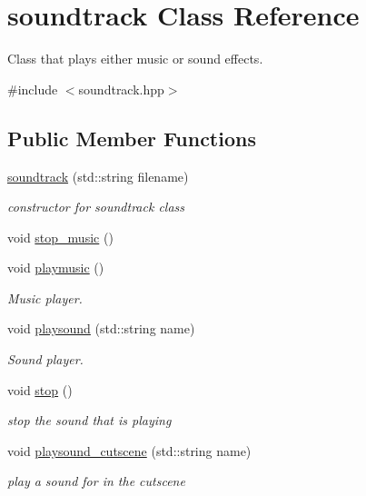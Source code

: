 \hypertarget{classsoundtrack}{}\section{soundtrack Class Reference}
\label{classsoundtrack}


Class that plays either music or sound effects.  




{\ttfamily \#include $<$soundtrack.\+hpp$>$}

\subsection*{Public Member Functions}
\begin{DoxyCompactItemize}
\item 
\hyperlink{classsoundtrack_add31bdeb1a693d541443f1d88586d3b6}{soundtrack} (std\+::string filename)
\begin{DoxyCompactList}\small\item\em constructor for soundtrack class \end{DoxyCompactList}\item 
void \hyperlink{classsoundtrack_a9f25fee4c6d5dbc820e2a18b13b43e68}{stop\+\_\+music} ()
\item 
void \hyperlink{classsoundtrack_a7569a4c0cde86548197756b8e05cf464}{playmusic} ()
\begin{DoxyCompactList}\small\item\em Music player. \end{DoxyCompactList}\item 
void \hyperlink{classsoundtrack_aa18de6469aca15922cfa8a8e8412f76d}{playsound} (std\+::string name)
\begin{DoxyCompactList}\small\item\em Sound player. \end{DoxyCompactList}\item 
\mbox{\label{classsoundtrack_a9047bea4f37493cbe81a990bc9d0c4e7}} 
void \hyperlink{classsoundtrack_a9047bea4f37493cbe81a990bc9d0c4e7}{stop} ()
\begin{DoxyCompactList}\small\item\em stop the sound that is playing \end{DoxyCompactList}\item 
void \hyperlink{classsoundtrack_a83744518feb748a979a67a56fae997fe}{playsound\+\_\+cutscene} (std\+::string name)
\begin{DoxyCompactList}\small\item\em play a sound for in the cutscene \end{DoxyCompactList}\end{DoxyCompactItemize}


